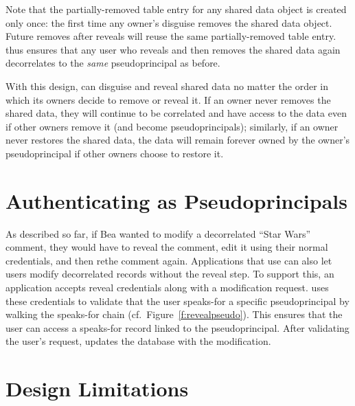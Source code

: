 Note that the partially-removed table entry for any shared data object is
created only once: the first time any owner's disguise removes the shared data
object. Future removes after reveals will reuse the same partially-removed table
entry.
%
\sys thus ensures that any user who reveals and then removes the shared data
again decorrelates to the \emph{same} pseudoprincipal as before.

%
With this design, \sys can disguise and reveal shared data no matter the order
in which its owners decide to remove or reveal it. If an owner never removes the
shared data, they will continue to be correlated and have access to the data
even if other owners remove it (and become pseudoprincipals); similarly, if an
owner never restores the shared data, the data will remain forever owned by the
owner's pseudoprincipal if other owners choose to restore it.
%





\section{Authenticating as Pseudoprincipals}

As described so far, if Bea wanted to modify a decorrelated ``Star Wars''
comment, they would have to reveal the comment, edit it using their normal
credentials, and then re\xx the comment again.
%
Applications that use \sys can also let users modify decorrelated records without the
reveal step.
%
To support this, an application accepts reveal credentials along with a
modification request. \sys uses these credentials to validate that the user
speaks-for a specific pseudoprincipal by walking the speaks-for chain (cf.\
Figure~\ref{f:revealpseudo}). This ensures that the user can access a speaks-for
record linked to the pseudoprincipal. After validating the user's request, \sys updates
the database with the modification.
%
%

\section{Design Limitations}
\label{s:design:limits}

